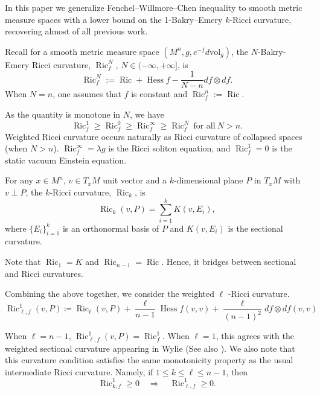 \documentclass[psamsfonts]{amsart}
\theoremstyle{definition}
\theoremstyle{remark}
\newcommand{\vol}{\mbox{vol}}
\newcommand{\ra}{\rightarrow}
\DeclareMathOperator{\Ric}{Ric}
\numberwithin{equation}{section}
\begin{document}
In this paper we generalize Fenchel–Willmore–Chen inequality to smooth metric
measure spaces with a lower bound on the 1-Bakry–Emery $k$-Ricci curvature, recovering almost of all previous work. 

    Recall for a smooth metric measure space $(M^n, g, e^{-f}d\vol_g)$, the $N$-Bakry-Emery Ricci curvature, $\operatorname{Ric}_f^N$,  $N \in (-\infty, +\infty]$,  is 
$$\operatorname{Ric}_f^N
:=
\operatorname{Ric}
+\operatorname{Hess}f
-\frac{1}{N-n}df\otimes df.$$
When $N=n$, one assumes that $f$ is constant and  $\Ric_f^n:= \Ric$.  

As the quantity is monotone in $N$, we have 
\[ \Ric_f^1 \ge \Ric_f^0 \ge \Ric_f^\infty \ge \operatorname{Ric}_f^N \ \mbox{for all} \ N >n.
\]
Weighted Ricci curvature occurs naturally as Ricci curvature of collapsed spaces (when $N > n$).  $\Ric_f^\infty = \lambda g$ is the Ricci soliton equation, and $\Ric_f^1 = 0$ is the static vacuum Einstein equation. 

For any $x \in M^n$, $v \in T_xM$ unit vector and a $k$-dimensional plane $P$ in $T_x M$ with $v \perp P$, the $k$-Ricci curvature, 
$\operatorname{Ric}_k$,  is 
$$\operatorname{Ric}_k (v, P) = \sum_{i=1}^k K(v, E_i),$$
where
$\{E_i\}_{i=1}^k$ is an orthonormal basis of $P$ and $K(v, E_i)$ is the sectional curvature.

Note that $\Ric_1 =K$ and $\Ric_{n-1} = \Ric$. Hence, it bridges between  sectional  and Ricci curvatures. 

Combining the above together, we consider the weighted $\ell$ -Ricci curvature. 
$$
\operatorname{Ric}^{1}_{\ell,f}(v, P)
\coloneqq
\operatorname{Ric}_{\ell}(v,P)
+
\frac{\ell}{n-1}\operatorname{Hess} f(v,v)
+
\frac{\ell}{(n-1)^2}df\otimes df (v, v)
$$

When $\ell =n-1$, $\operatorname{Ric}^{1}_{\ell,f}(v, P) = \Ric_f^1$. 
When $\ell = 1$, this agrees with the weighted sectional curvature appearing in Wylie \cite{Wylie2015} (See also \cite[Page 3]{wylie2016geometry}).
We also note that this curvature condition satisfies the same monotonicity
property as the usual intermediate Ricci curvature. Namely, if
$1 \leq k\leq \ell \leq n-1$,
then
$$
\operatorname{Ric}^{1}_{k,f}\geq 0
\quad\Longrightarrow\quad
\operatorname{Ric}^{1}_{\ell,f}\geq 0.
$$
\end{document}
